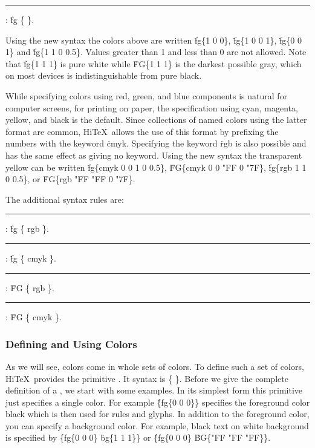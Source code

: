 \medskip
\rule{}:
\.{fg} \.{\{}     \.{\}}.
\medskip

Using the new syntax the colors above are written
\.{fg\{1 0 0\}}, \.{fg\{1 0 0 1\}},
\.{fg\{0 0 1\}} and \.{fg\{1 1 0 0.5\}}.
Values greater than 1 and less than 0 are not allowed.
Note that \.{fg\{1 1 1\}} is pure white while  \.{FG\{1 1 1\}} is
the darkest possible gray, which on most devices is indistinguishable
from pure black.

While specifying colors using red, green, and blue components is natural for
computer screens, for printing on paper, the specification using cyan, magenta, yellow,
and black is the default. Since collections of named colors using the latter format
are common, Hi\TeX\ allows the use of this format by prefixing the numbers with
the keyword \.{cmyk}. Specifying the keyword \.{rgb} is also possible and has the
same effect as giving no keyword. Using the new syntax the transparent yellow
can be written \.{fg\{cmyk 0 0 1 0 0.5\}},  \.{FG\{cmyk 0 0 "FF 0 "7F\}},
 \.{fg\{rgb 1 1 0 0.5\}}, or \.{FG\{rgb "FF "FF 0 "7F\}}.

The additional syntax rules are:

\medskip
\rule{}:
\.{fg} \.{\{ rgb}     \.{\}}.
\rule{}:
\.{fg} \.{\{ cmyk}      \.{\}}.
\rule{}:
   \.{FG} \.{\{ rgb}     \.{\}}.
\rule{}:
   \.{FG} \.{\{ cmyk}      \.{\}}.
\medskip




\subsubsection{Defining and Using Colors}
As we will see, colors come in whole sets of colors.
To define such a set of colors, Hi\TeX\ provides
the primitive . It syntax is
\medskip
\prim{} \.{\{}  \.{\}}.
\medskip
Before we give the complete definition of a  ,
we start with some examples.
In its simplest form this primitive just specifies a single color.
For example \.{\{fg\{0 0 0\}\}} specifies
the foreground color black which is then used for rules and glyphs.
In addition to the foreground color, you can specify a background color.
For example, black text on white background is specified by
\.{\{fg\{0 0 0\}} \.{bg\{1 1 1\}\}} or
\.{\{fg\{0 0 0\}} \.{BG\{"FF "FF "FF\}\}}.

